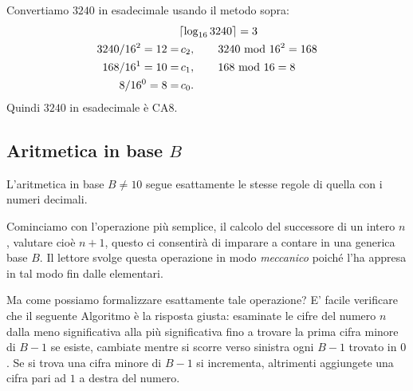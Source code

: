 \begin{ex}
Convertiamo $3240$ in esadecimale usando il metodo sopra:
\begin{align*}
  &\lceil \log_{16} 3240 \rceil = 3\\
  3240 / 16^2 = 12 = &\, c_2, \qquad 3240 \ \text{mod}\ 16^2 = 168\\
  168 / 16^1 = 10 = &\, c_1,  \qquad 168 \ \text{mod}\ 16 = 8\\
  8 / 16^0 = 8 = &\, c_0.
\end{align*}
Quindi $3240$ in esadecimale è $\mathrm{CA}8$.
\end{ex}

\subsection{Aritmetica in base $B$}

L'aritmetica in base $B\neq 10$ segue esattamente le stesse regole di quella con i numeri decimali.

Cominciamo con l'operazione più semplice, il calcolo del successore di un intero $n$, valutare cioè $n+1$, questo ci consentirà di imparare a contare in una generica base $B$. Il lettore svolge questa operazione in modo \emph{meccanico} poiché l'ha appresa in tal modo fin dalle elementari.

Ma come possiamo formalizzare esattamente tale operazione? E' facile verificare che il seguente Algoritmo è la risposta giusta:
esaminate le cifre del numero $n$ dalla meno significativa alla più
significativa fino a trovare la prima cifra minore di $B-1$ se esiste, cambiate
mentre si scorre verso sinistra ogni $B-1$ trovato in $0$. Se si trova una
cifra minore di $B-1$ si incrementa, altrimenti aggiungete una cifra pari ad
$1$ a destra del numero.


